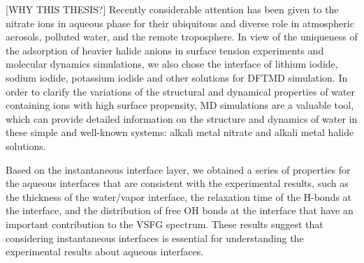 [WHY THIS THESIS?]
Recently considerable attention has been given to the nitrate ions in aqueous phase 
for their ubiquitous and diverse role in atmospheric aerosols, polluted water, 
and the remote troposphere\cite{XuM2009,Jubb2012}.
In view of the uniqueness of the adsorption of heavier halide anions in surface tension experiments and molecular dynamics simulations, 
we also chose the interface of lithium iodide, sodium iodide, potassium iodide and other solutions for DFTMD simulation.
In order to clarify the variations of the structural and dynamical properties 
of water containing ions with high surface propensity, MD simulations are a valuable tool, 
which can provide detailed information on the structure and dynamics  
of water in these simple and well-known systems: alkali metal nitrate and alkali metal halide solutions\cite{KM98}.



Based on the instantaneous interface layer, we obtained a series of properties for the aqueous interfaces that are consistent with the experimental results, 
such as the thickness of the water/vapor interface, the relaxation time of the H-bonds at the interface, 
and the distribution of free OH bonds at the interface that have an important contribution to the VSFG spectrum.
These results suggest that considering instantaneous interfaces is essential for understanding the experimental results about aqueous interfaces.

